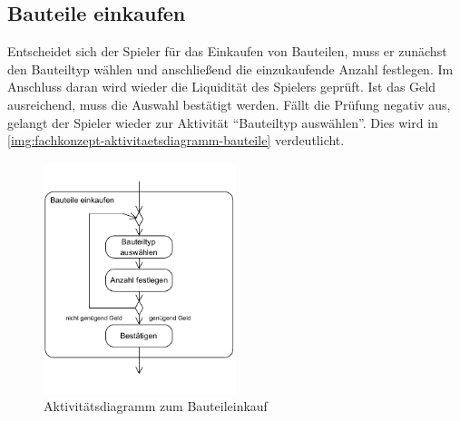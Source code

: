 \subsection{Bauteile einkaufen}
\label{sec:fachkonzept-aktivitaetsdiagramm-bauteile}

Entscheidet sich der Spieler für das Einkaufen von Bauteilen, muss er zunächst den Bauteiltyp wählen und anschließend die einzukaufende Anzahl festlegen. Im Anschluss daran wird wieder die Liquidität des Spielers geprüft. Ist das Geld ausreichend, muss die Auswahl bestätigt werden. Fällt die Prüfung negativ aus, gelangt der Spieler wieder zur Aktivität “Bauteiltyp auswählen”. Dies wird in \vref{img:fachkonzept-aktivitaetsdiagramm-bauteile} verdeutlicht.

\begin{figure}[h]
  \centering
    \includegraphics[trim = 0cm 1cm 0cm 1cm, width=0.5\textwidth]{30_Fachkonzept/15_aktivitaetsdiagramm/activity3.pdf}
  \caption{Aktivitätsdiagramm zum Bauteileinkauf}
  \label{img:fachkonzept-aktivitaetsdiagramm-bauteile}
\end{figure}